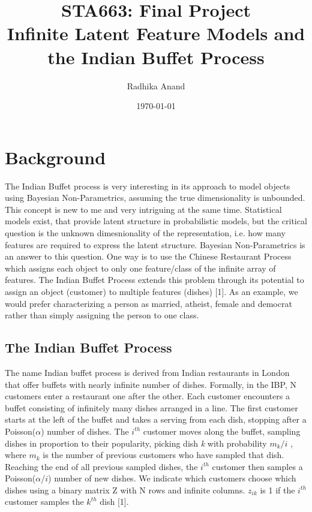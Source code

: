 \documentclass[11pt]{article}
\begin{document}
\author{Radhika Anand}
\title{STA663: Final Project \\Infinite Latent Feature Models and the Indian Buffet Process}
\date{\today}
\maketitle

\section{Background}

The Indian Buffet process is very interesting in its approach to model objects using Bayesian Non-Parametrics, assuming the true dimensionality is unbounded. This concept is new to me and very intriguing at the same time. Statistical models exist, that provide latent structure in probabilistic models, but the critical question is the unknown dimesnionality of the representation, i.e. how many features are required to express the latent structure. Bayesian Non-Parametrics is an answer to this question. One way is to use the Chinese Restaurant Process which assigns each object to only one feature/class of the infinite array of features. The Indian Buffet Process extends this problem through its potential to assign an object (customer) to multiple features (dishes) [1]. As an example, we would prefer characterizing a person as married, atheist, female and democrat rather than simply assigning the person to one class.

\subsection{The Indian Buffet Process}

The name Indian buffet process is derived from Indian restaurants in London that offer buffets with nearly infinite number of dishes. Formally, in the IBP, N customers enter a restaurant one after the other. Each customer encounters a buffet consisting of infinitely many dishes arranged in a line. The first customer starts at the left of the buffet and takes a serving from each dish, stopping after a Poisson($\alpha$) number of dishes. The $i^{th}$ customer moves along the buffet, sampling dishes in proportion to their popularity, picking dish \textit{k} with probability $m_{k}/i$ , where $m_{k}$ is the number of previous customers who have sampled that dish. Reaching the end of all previous sampled dishes, the $i^{th}$ customer then samples a Poisson($\alpha$/$i$) number of new dishes. We indicate which customers choose which dishes using a binary matrix Z with N rows and infinite columns. $z_{ik}$ is 1 if the $i^{th}$ customer samples the $k^{th}$ dish [1].\\ 
\end{document}
